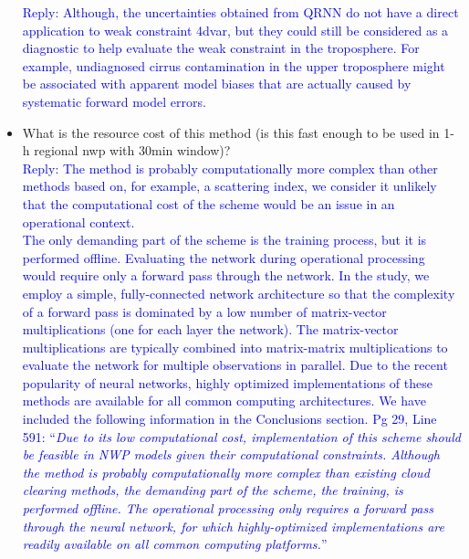 \documentclass[11pt,a4paper,draft]{article}
\begin{document}
\begin{itemize}
\textcolor{blue}{Reply: Although, the uncertainties obtained from QRNN do not have a direct application to weak constraint 4dvar, but they could still be considered as a diagnostic to help evaluate the weak constraint in the troposphere. For example, undiagnosed cirrus contamination in the upper troposphere might be associated with apparent model biases that are actually caused by systematic forward model errors. }\\
		
		
		
\item	
		What is the resource cost of this method (is this fast enough to be used in 1-h regional
		nwp with 30min window)?\\
	
\textcolor{blue}{Reply: The method is probably computationally more complex than other methods
	based on, for example, a scattering index, we consider it unlikely that the
	computational cost of the scheme would be an issue in an operational context.\\
	The only demanding part of the scheme is the training process, but it is performed offline. Evaluating the network during operational processing  would require only a forward pass through the network. In the study, we employ a simple, fully-connected network architecture so that 	the complexity of a forward pass is dominated by a low number of matrix-vector multiplications (one for each layer the network). The matrix-vector
	multiplications are typically combined into matrix-matrix multiplications to
	evaluate the network for multiple observations in parallel. Due to the recent
	popularity of neural networks, highly optimized implementations of these methods
	are available for all common computing architectures. 
	We have included the following information in the Conclusions section.
Pg 29, Line 591: ``\textit{Due to its low computational cost, implementation of this scheme should be feasible in NWP models given their computational constraints. Although the method is probably computationally more complex than existing cloud clearing methods, the demanding part of the scheme, the training, is performed offline. The operational processing only requires a forward pass through the neural network, for which highly-optimized implementations are readily available on all common computing platforms.}''}	
\end{itemize}
		
 
 	
	
\end{document}
